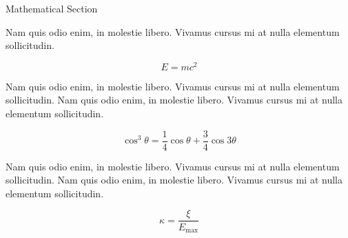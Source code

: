 \documentclass[final]{beamer}
\newlength{\onecolwid}
\newlength{\twocolwid}
\begin{document}
\begin{frame}[t]
\begin{columns}[t]
\begin{column}{\twocolwid}

      \begin{columns}[t,totalwidth=\twocolwid] %

        \begin{column}{\onecolwid} %


          \begin{block}{Mathematical Section}

            Nam quis odio enim, in molestie libero. Vivamus cursus mi at nulla elementum
            sollicitudin.

            \begin{equation}
              E = mc^{2}
              \label{eqn:Einstein}
            \end{equation}

            Nam quis odio enim, in molestie libero. Vivamus cursus mi at nulla elementum
            sollicitudin. Nam quis odio enim, in molestie libero. Vivamus cursus mi at nulla
            elementum sollicitudin.

            \begin{equation}
              \cos^3 \theta =\frac{1}{4}\cos\theta+\frac{3}{4}\cos 3\theta
              \label{eq:refname}
            \end{equation}

            Nam quis odio enim, in molestie libero. Vivamus cursus mi at nulla elementum
            sollicitudin. Nam quis odio enim, in molestie libero. Vivamus cursus mi at nulla
            elementum sollicitudin.

            \begin{equation}
              \kappa =\frac{\xi}{E_{\mathrm{max}}} %
            \end{equation}

          \end{block}


        \end{column} %


\end{columns}
\end{column}
\end{columns}
\end{frame}
\end{document}
